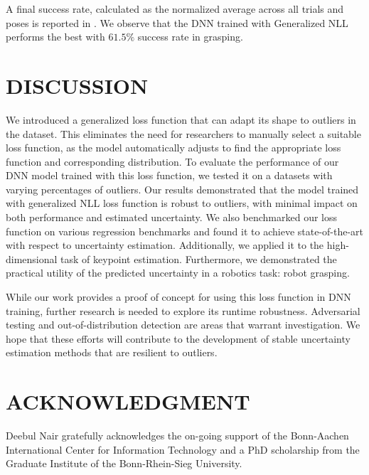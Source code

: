 \documentclass[letterpaper, 10 pt, conference]{ieeeconf}  %
\begin{document}
A final success rate, calculated as the normalized average across all trials and poses is reported in  . 
We observe that the DNN trained with Generalized NLL performs the best with $61.5 \%$ success rate in grasping.

  
\section{DISCUSSION}

We introduced a generalized loss function that can adapt its shape to outliers in the dataset. This eliminates the need for researchers to manually select a suitable loss function, as the model automatically adjusts to find the appropriate loss function and corresponding distribution.
To evaluate the performance of our DNN model trained with this loss function, we tested it on a datasets with varying percentages of outliers. Our results demonstrated that the model trained with generalized NLL loss function is robust to outliers, with minimal impact on both performance and estimated uncertainty.
We also benchmarked our loss function on various regression benchmarks and found it to achieve state-of-the-art with respect to uncertainty estimation. Additionally, we applied it to the high-dimensional task of keypoint estimation. Furthermore, we demonstrated the practical utility of the predicted uncertainty in a robotics task: robot grasping.

While our work provides a proof of concept for using this loss function in DNN training, further research is needed to explore its runtime robustness. Adversarial testing and out-of-distribution detection are areas that warrant investigation. We hope that these efforts will contribute to the development of stable uncertainty estimation methods that are resilient to outliers.
\addtolength{\textheight}{-12cm}   %


\section*{ACKNOWLEDGMENT}
Deebul Nair gratefully acknowledges the on-going support
of the Bonn-Aachen International Center for Information Technology and a PhD
scholarship from the Graduate Institute of the Bonn-Rhein-Sieg University. 
\end{document}
